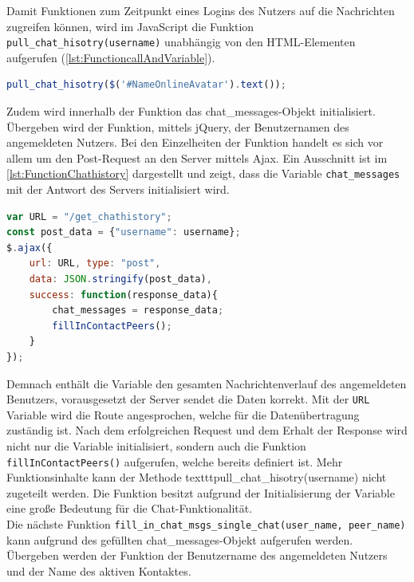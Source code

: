 \documentclass[a4paper,titlepage,halfparskip,12pt]{scrreprt}
\begin{document}
\begin{onehalfspacing}
\pagebreak

Damit Funktionen zum Zeitpunkt eines Logins des Nutzers auf die Nachrichten zugreifen können, wird im JavaScript die Funktion \texttt{pull\_chat\_hisotry(username)} unabhängig von den \ac{HTML}-Elementen aufgerufen (\autoref{lst:FunctioncallAndVariable}).
\begin{lstlisting}[language=Javascript,caption=Aufruf der Funktion \texttt{pull\_chat\_hisotry(username)},label={lst:FunctioncallAndVariable}]
pull_chat_hisotry($('#NameOnlineAvatar').text());
\end{lstlisting}
Zudem wird innerhalb der Funktion das chat\_messages-Objekt initialisiert. Übergeben wird der Funktion, mittels jQuery, der Benutzernamen des angemeldeten Nutzers.
Bei den Einzelheiten der Funktion handelt es sich vor allem um den Post-Request an den Server mittels Ajax. Ein Ausschnitt ist im \autoref{lst:FunctionChathistory} dargestellt und zeigt, dass die Variable \texttt{chat\_messages} mit der Antwort des Servers initialisiert wird.
\begin{lstlisting}[language=Javascript,caption=Ausschnitt aus der Funktion \texttt{pull\_chat\_hisotry(username)} ,label={lst:FunctionChathistory}]
var URL = "/get_chathistory";
const post_data = {"username": username};
$.ajax({
	url: URL, type: "post",
	data: JSON.stringify(post_data),
	success: function(response_data){
		chat_messages = response_data;
		fillInContactPeers();
	}
});
\end{lstlisting}
Demnach enthält die Variable den gesamten Nachrichtenverlauf des angemeldeten Benutzers, vorausgesetzt der Server sendet die Daten korrekt. Mit der \texttt{URL} Variable wird die Route angesprochen, welche für die Datenübertragung zuständig ist. Nach dem erfolgreichen Request und dem Erhalt der Response wird nicht nur die Variable initialisiert, sondern auch die Funktion \texttt{fillInContactPeers()} aufgerufen, welche bereits definiert ist. Mehr Funktionsinhalte kann der Methode texttt{pull\_chat\_hisotry(username)} nicht zugeteilt werden. Die Funktion besitzt aufgrund der Initialisierung der Variable eine große Bedeutung für die Chat-Funktionalität.\\
Die nächste Funktion \texttt{fill\_in\_chat\_msgs\_single\_chat(user\_name, peer\_name)} kann aufgrund des gefüllten chat\_messages-Objekt aufgerufen werden. Übergeben werden der Funktion der Benutzername des angemeldeten Nutzers und der Name des aktiven Kontaktes. 
\begin{lstlisting}[language=Javascript,caption=Füllen des Chatfensters entsprechnd des \texttt{chat\_messages-Objektes}, label={lst:FunctionFillInChat}]

\end{lstlisting}
\end{onehalfspacing}
\end{document}
